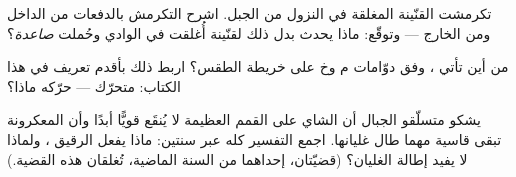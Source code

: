 \begin{exercise}[$\star\star$]\label{exo:g5:air-pressure-weather:9}
تكرمشت القنّينة المغلقة في النزول من الجبل. اشرح التكرمش
بالدفعات من الداخل ومن الخارج --- وتوقّع: ماذا يحدث بدل ذلك
لقنّينة أُغلقت في الوادي وحُملت \emph{صاعدة}؟
\end{exercise}

\begin{exercise}[$\star\star$]\label{exo:g5:air-pressure-weather:10}
من أين تأتي ، وفق دوّامات م وخ على خريطة الطقس؟ اربط ذلك
بأقدم تعريف في هذا الكتاب:   متحرّك --- حرّكه ماذا؟
\end{exercise}

\begin{exercise}[$\star\star$]\label{exo:g5:air-pressure-weather:11}
يشكو متسلّقو الجبال أن الشاي على القمم العظيمة لا يُنقَع قويًّا
أبدًا وأن المعكرونة تبقى قاسية مهما طال غليانها. اجمع التفسير
كله عبر سنتين: ماذا يفعل  الرقيق ،
ولماذا لا يفيد إطالة الغليان؟ (قضيّتان، إحداهما من السنة
الماضية، تُغلقان هذه القضية.)
\end{exercise}
